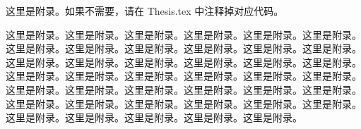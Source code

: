 \begin{appendix}
    这里是附录。如果不需要，请在 Thesis.tex 中注释掉对应代码。

    这里是附录。这里是附录。这里是附录。这里是附录。这里是附录。这里是附录。这里是附录。这里是附录。这里是附录。这里是附录。这里是附录。这里是附录。这里是附录。这里是附录。这里是附录。这里是附录。这里是附录。这里是附录。这里是附录。这里是附录。这里是附录。这里是附录。这里是附录。这里是附录。这里是附录。这里是附录。这里是附录。这里是附录。这里是附录。这里是附录。这里是附录。这里是附录。这里是附录。这里是附录。这里是附录。这里是附录。这里是附录。这里是附录。这里是附录。这里是附录。这里是附录。
\end{appendix}